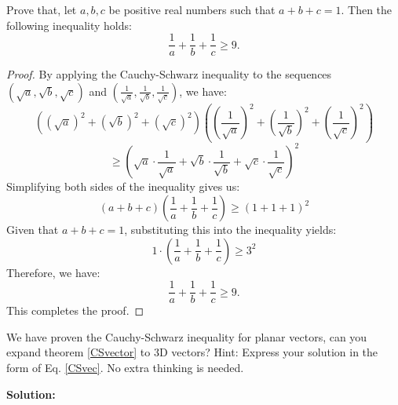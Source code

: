\documentclass[
	12pt, %
	fleqn, %
	a4paper, %
]{LegrandOrangeBook}
\begin{document}
\begin{exercise}
    Prove that, let \( a, b, c \) be positive real numbers such that \( a + b + c = 1 \). Then the following inequality holds:
\[
\frac{1}{a} + \frac{1}{b} + \frac{1}{c} \geq 9.
\]
\end{exercise}
\begin{proof}
    By applying the Cauchy-Schwarz inequality to the sequences \( (\sqrt{a}, \sqrt{b}, \sqrt{c}) \) and \( (\frac{1}{\sqrt{a}}, \frac{1}{\sqrt{b}}, \frac{1}{\sqrt{c}} ) \), we have:
\[
\left( (\sqrt{a})^2 + (\sqrt{b})^2 + (\sqrt{c})^2 \right) \left( \left(\frac{1}{\sqrt{a}}\right)^2 + \left(\frac{1}{\sqrt{b}}\right)^2 + \left(\frac{1}{\sqrt{c}}\right)^2 \right) 
\]
\[
\geq \left( \sqrt{a} \cdot \frac{1}{\sqrt{a}} + \sqrt{b} \cdot \frac{1}{\sqrt{b}} + \sqrt{c} \cdot \frac{1}{\sqrt{c}} \right)^2
\]
Simplifying both sides of the inequality gives us:
\[
(a + b + c) \left( \frac{1}{a} + \frac{1}{b} + \frac{1}{c} \right) \geq (1 + 1 + 1)^2
\]
Given that \( a + b + c = 1 \), substituting this into the inequality yields:
\[
1 \cdot \left( \frac{1}{a} + \frac{1}{b} + \frac{1}{c} \right) \geq 3^2
\]
Therefore, we have:
\[
\frac{1}{a} + \frac{1}{b} + \frac{1}{c} \geq 9.
\]
This completes the proof.
\end{proof}
\begin{exercise}
    We have proven the Cauchy-Schwarz inequality for planar vectors, can you expand theorem \ref{CSvector}
to 3D vectors? Hint: Express your solution in the form of Eq. \ref{CSvec}. No extra thinking is needed.
\end{exercise}
\textbf{Solution:}
\end{document}
